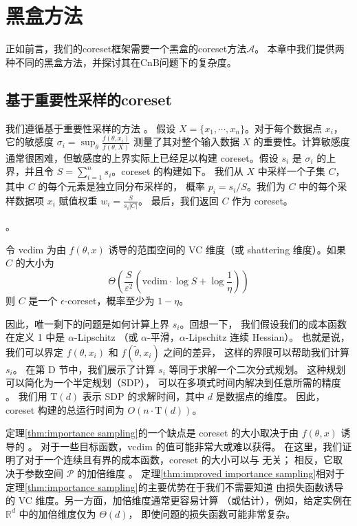 \chapter{黑盒方法}

正如前言，我们的coreset框架需要一个黑盒的coreset方法$\mathcal{A}$。
本章中我们提供两种不同的黑盒方法，并探讨其在CnB问题下的复杂度。

\section{基于重要性采样的coreset}

我们遵循基于重要性采样的方法 \citep{LS10}。
假设 $X = \{x_1, \cdots, x_n\}$。对于每个数据点 $x_i$，
它的敏感度 $\sigma_i = \sup_\theta \frac{f(\theta, x_i)}{f(\theta, X)}$ 
测量了其对整个输入数据 $X$ 的重要性。计算敏感度通常很困难，但敏感度的上界实际上已经足以构建 
coreset。假设 $s_i$ 是 $\sigma_i$ 的上界，并且令 $S = \sum_{i=1}^n s_i$。coreset 的构建如下。
我们从 $X$ 中采样一个子集 $C$，其中 $C$ 的每个元素是独立同分布采样的，
概率 $p_i = s_i / S$。我们为 $C$ 中的每个采样数据项 $x_i$ 赋值权重 $w_i = \frac{S}{s_i |C|}$。
最后，我们返回 $C$ 作为 coreset。


\begin{theorem}。

令 vcdim 为由 $f(\theta, x)$ 诱导的范围空间的 VC 维度（或 shattering 维度）。如果 $C$ 的大小为
\begin{equation}
\Theta \left( \frac{S}{\varepsilon^2} \left( \text{vcdim} \cdot \log S + \log \frac{1}{\eta} \right) \right)
\end{equation}
则 $C$ 是一个 $\epsilon$-coreset，概率至少为 $1 - \eta$。
\label{thm:importance sampling}
\end{theorem}

因此，唯一剩下的问题是如何计算上界 $s_i$。回想一下，
我们假设我们的成本函数在定义 1 中是 $\alpha$-Lipschitz
（或 $\alpha$-平滑，$\alpha$-Lipschitz 连续 Hessian）。
也就是说，我们可以界定 $f(\theta, x_i)$ 和 $f(\tilde{\theta}, x_i)$ 之间的差异，
这样的界限可以帮助我们计算 $s_i$。
在第 D 节中，我们展示了计算 $s_i$ 等同于求解一个二次分式规划。
这种规划可以简化为一个半定规划（SDP）\citep{BT09}，
可以在多项式时间内解决到任意所需的精度 \citep{GM12}。
我们用 $\text{T}(d)$ 表示 SDP 的求解时间，其中 $d$ 是数据点的维度。
因此，coreset 构建的总运行时间为 $O(n \cdot \text{T}(d))$。

定理\ref{thm:importance sampling}的一个缺点是 coreset 的大小取决于由 $f(\theta, x)$ 诱导的 。
对于一些目标函数，vcdim 的值可能非常大或难以获得。
在这里，我们证明了对于一个连续且有界的成本函数，coreset 的大小可以与 无关；
相反，它取决于参数空间 $\mathcal{P}$ 的加倍维度 。
定理\ref{thm:improved importance sampling}相对于定理\ref{thm:importance sampling}的主要优势在于我们不需要知道
由损失函数诱导的 VC 维度。另一方面，加倍维度通常更容易计算
（或估计），例如，给定实例在 $\mathbb{R}^d$ 中的加倍维度仅为 $\Theta(d)$，
即使问题的损失函数可能非常复杂。

